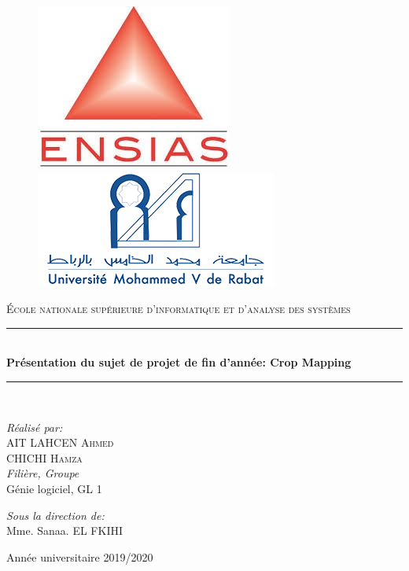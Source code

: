 \documentclass[12pt, openany]{report}
\newcommand{\HRule}{\rule{\linewidth}{0.5mm}}
\begin{document}
\begin{titlepage}
  \begin{sffamily}
  \begin{center}

	\begin{figure}[t]
	   \begin{minipage}{0.48\textwidth } 
	     \includegraphics[width=.3\linewidth , left]{ensias.JPG}
	   \end{minipage}\hfill
	   \begin{minipage}{0.48\textwidth }
	     \includegraphics[width=.4\linewidth , right]{univesite.JPG}
	   \end{minipage}
	\end{figure}
     
    \textsc{\LARGE École nationale supérieure d'informatique et d'analyse des systèmes}\\[4cm]


    \HRule \\[0.5cm]
    { \huge \bfseries Présentation du sujet de projet de fin d'année: Crop Mapping\\[0.4cm] }
	\HRule\\[4cm]

    \begin{minipage}{0.4\textwidth}
      \begin{flushleft} \large
        \emph{Réalisé par:}\\
            AIT LAHCEN \textsc{Ahmed}\\
	        CHICHI \textsc{Hamza}\\
       \emph{Filière, Groupe}\\
	        Génie logiciel, GL 1\\
      \end{flushleft}
    \end{minipage}
    \begin{minipage}{0.4\textwidth}
      \begin{flushright} \large
       \emph{Sous la direction de:}\\
	Mme. Sanaa. \textsc{EL FKIHI}\\
	\end{flushright}
    \end{minipage}

    \vfill

    {\large Année universitaire 2019/2020}

  \end{center}
  \end{sffamily}
\end{titlepage}
\end{document}
